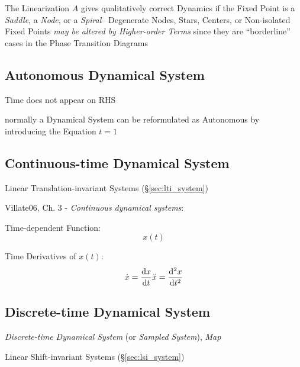 The Linearization $A$ gives qualitatively correct Dynamics if the Fixed Point
is a \emph{Saddle}, a \emph{Node}, or a \emph{Spiral}--
Degenerate Nodes, Stars, Centers, or Non-isolated Fixed Points \emph{may be
altered by Higher-order Terms} since they are ``borderline'' cases in the Phase
Transition Diagrams



\subsection{Autonomous Dynamical System}\label{sec:autonomous_dynamical_system}

Time does not appear on RHS

normally a Dynamical System can be reformulated as Autonomous by introducing
the Equation $\dot{t} = 1$



\subsection{Continuous-time Dynamical System}
\label{sec:continuous_dynamical_system}

\fist Linear Translation-invariant Systems (\S\ref{sec:lti_system})

Villate06, Ch. 3 - \emph{Continuous dynamical systems}:

Time-dependent Function:
\[
  x(t)
\]

Time Derivatives of $x(t)$:
\[
  \dot{x} = \frac{\mathrm{d}x}{\mathrm{d}t} \\ \ddot{x} = \frac{\mathrm{d}^2x}{\mathrm{d}t^2}
\]



\subsection{Discrete-time Dynamical System}\label{sec:discrete_dynamical_system}

\emph{Discrete-time Dynamical System} (or \emph{Sampled System}), \emph{Map}

\fist Linear Shift-invariant Systems (\S\ref{sec:lsi_system})

